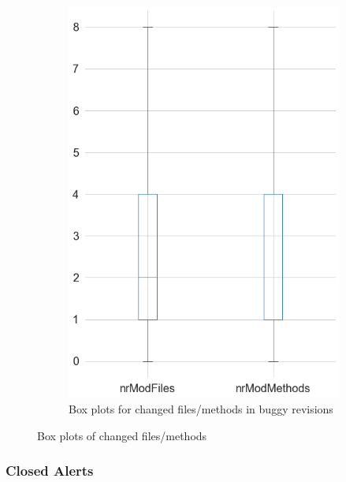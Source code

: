 \begin{figure}[H]
\begin{subfigure}{0.5\textwidth}
		\includegraphics[scale=0.3]{./src/data_analysis/buggy_box_files.png}
		\caption{Box plots for changed files/methods in buggy revisions}
	\end{subfigure}
	\caption{Box plots of changed files/methods}
	\label{box:changed_files}
\end{figure}

\newpage
\subsubsection{Closed Alerts}

